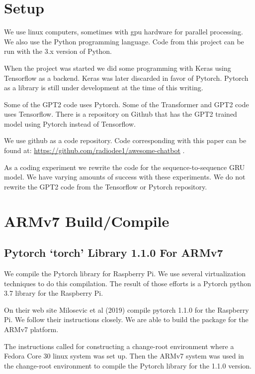 \section{Setup}

We use linux computers, sometimes with gpu hardware for parallel processing.
We also use the Python programming language. Code from this project
can be run with the 3.x version of Python.

When the project was started we did some programming with Keras using
Tensorflow as a backend. Keras was later discarded in favor of Pytorch.
Pytorch as a library is still under development at the time of this
writing.

Some of the GPT2 code uses Pytorch. Some of the Transformer and GPT2 code uses Tensorflow. There is a repository on Github that has the GPT2 trained model using Pytorch instead of Tensorflow.

We use github as a code repository. Code corresponding with this paper
can be found at: \href{https://github.com/radiodee1/awesome-chatbot}{https://github.com/radiodee1/awesome-chatbot}
. 

As a coding experiment we rewrite the code for the sequence-to-sequence GRU model. We have varying amounts of success with these experiments. We do not rewrite the GPT2 code from the Tensorflow or Pytorch repository.

\section{ARMv7 Build/Compile}

\subsection*{Pytorch `torch' Library 1.1.0 For ARMv7}
We compile the Pytorch library for Raspberry Pi. We use several virtualization techniques to do this compilation. The result of those efforts is a Pytorch python 3.7 library for the Raspberry Pi.

On their web site Milosevic et al (2019)\cite{2018Milosevic} compile pytorch 1.1.0 for the Raspberry Pi. We follow their instructions closely. We are able to build the package for the ARMv7 platform.

The instructions called for constructing a change-root environment where a Fedora Core 30 linux system was set up. Then the ARMv7 system was used in the change-root environment to compile the Pytorch library for the 1.1.0 version.

